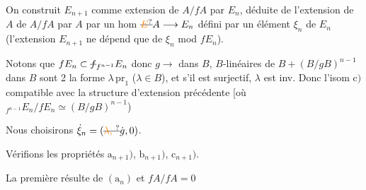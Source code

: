 On construit $E_{n+1}$ comme extension de $A/fA$ par $E_n$,  déduite de l'extension  de $A$ de $A/fA$ par $A$ par un hom $\deleted{\unsure{E}}A\longrightarrow E_n$ défini par un élément $\xi_n$ de $E_n$ (l'extension $E_{n+1}$ ne dépend que de $\xi_n$ mod $fE_n$).

Notons que  $fE_n\subset\deleted{f}{}_{f^{n-1}}E_n$ donc
 $g\longrightarrow$  dans $B$,        $B$-linéaires de $B+(B/gB)^{n-1}$ dans $B$ sont  2 la  forme $\lambda\,\mathrm{pr}_1$ ($\lambda\in B$), et s'il  est surjectif, $\lambda$ est inv. Donc l'isom $\mathrm c)$   compatible avec la structure d'extension précédente [où $ {}_{f^{n-1}}E_n/fE_n\simeq(B/gB)^{n-1}$)

Nous choisirons $\dot\xi_n=(\deleted{\unsure{\lambda,\ }}\dot g,0)$. 

Vérifions les propriétés $\mathrm a_{n+1})$, $\mathrm b_{n+1})$, $\mathrm c_{n+1})$.

La première résulte  de $(\mathrm a_n)$ et $fA/fA=0$


